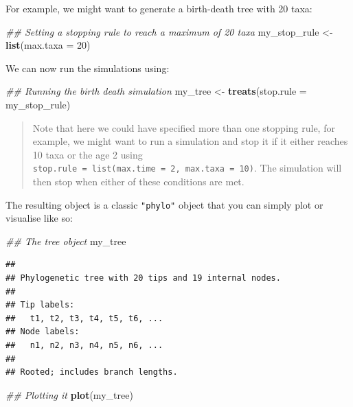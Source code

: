 \documentclass[
]{book}
\newenvironment{Shaded}{\begin{snugshade}}{\end{snugshade}}
\newcommand{\CommentTok}[1]{\textcolor[rgb]{0.56,0.35,0.01}{\textit{#1}}}
\newcommand{\DataTypeTok}[1]{\textcolor[rgb]{0.13,0.29,0.53}{#1}}
\newcommand{\DecValTok}[1]{\textcolor[rgb]{0.00,0.00,0.81}{#1}}
\newcommand{\KeywordTok}[1]{\textcolor[rgb]{0.13,0.29,0.53}{\textbf{#1}}}
\newcommand{\NormalTok}[1]{#1}
\newcommand{\StringTok}[1]{\textcolor[rgb]{0.31,0.60,0.02}{#1}}
\begin{document}
For example, we might want to generate a birth-death tree with 20 taxa:

\begin{Shaded}
\begin{Highlighting}[]
\CommentTok{\#\# Setting a stopping rule to reach a maximum of 20 taxa}
\NormalTok{my\_stop\_rule \textless{}{-}}\StringTok{ }\KeywordTok{list}\NormalTok{(}\DataTypeTok{max.taxa =} \DecValTok{20}\NormalTok{)}
\end{Highlighting}
\end{Shaded}

We can now run the simulations using:

\begin{Shaded}
\begin{Highlighting}[]
\CommentTok{\#\# Running the birth death simulation}
\NormalTok{my\_tree \textless{}{-}}\StringTok{ }\KeywordTok{treats}\NormalTok{(}\DataTypeTok{stop.rule =}\NormalTok{ my\_stop\_rule)}
\end{Highlighting}
\end{Shaded}

\begin{quote}
Note that here we could have specified more than one stopping rule, for example, we might want to run a simulation and stop it if it either reaches 10 taxa or the age 2 using \texttt{stop.rule\ =\ list(max.time\ =\ 2,\ max.taxa\ =\ 10)}. The simulation will then stop when either of these conditions are met.
\end{quote}

The resulting object is a classic \texttt{"phylo"} object that you can simply plot or visualise like so:

\begin{Shaded}
\begin{Highlighting}[]
\CommentTok{\#\# The tree object}
\NormalTok{my\_tree}
\end{Highlighting}
\end{Shaded}

\begin{verbatim}
## 
## Phylogenetic tree with 20 tips and 19 internal nodes.
## 
## Tip labels:
##   t1, t2, t3, t4, t5, t6, ...
## Node labels:
##   n1, n2, n3, n4, n5, n6, ...
## 
## Rooted; includes branch lengths.
\end{verbatim}

\begin{Shaded}
\begin{Highlighting}[]
\CommentTok{\#\# Plotting it}
\KeywordTok{plot}\NormalTok{(my\_tree)}
\end{Highlighting}
\end{Shaded}
\end{document}
